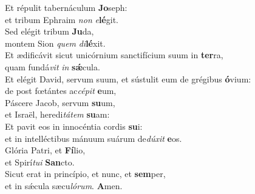 \oddverse Et répulit tabernáculum \textbf{Jo}seph:~\*\\
\oddverse et tribum Ephraim \textit{non} \textit{e}\textbf{lé}git.\\
\evenverse Sed elégit tribum \textbf{Ju}da,~\*\\
\evenverse montem Sion \textit{quem} \textit{di}\textbf{lé}xit.\\
\oddverse Et ædificávit sicut unicórnium sanctifícium suum in \textbf{ter}ra,~\*\\
\oddverse quam fundá\textit{vit} \textit{in} \textbf{sǽ}cula.\\
\evenverse Et elégit David, servum suum, et sústulit eum de grégibus \textbf{ó}vium:~\*\\
\evenverse de post fœtántes ac\textit{cé}\textit{pit} \textbf{e}um,\\
\oddverse Páscere Jacob, servum \textbf{su}um,~\*\\
\oddverse et Israël, heredi\textit{tá}\textit{tem} \textbf{su}am:\\
\evenverse Et pavit eos in innocéntia cordis \textbf{su}i:~\*\\
\evenverse et in intelléctibus mánuum suárum de\textit{dú}\textit{xit} \textbf{e}os.\\
\oddverse Glória Patri, et \textbf{Fí}lio,~\*\\
\oddverse et Spirí\textit{tu}\textit{i} \textbf{San}cto.\\
\evenverse Sicut erat in princípio, et nunc, et \textbf{sem}per,~\*\\
\evenverse et in sǽcula sæcu\textit{ló}\textit{rum}. \textbf{A}men.\\
